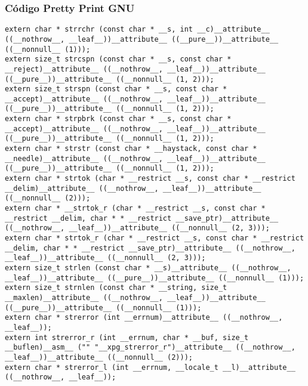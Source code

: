 \documentclass{beamer}
\begin{document}
\begin{frame}[fragile]
\frametitle{C\'odigo Pretty Print GNU}
\begin{verbatim}
extern char * strrchr (const char * __s, int __c)__attribute__ ((__nothrow__, __leaf__))__attribute__ ((__pure__))__attribute__ ((__nonnull__ (1)));
extern size_t strcspn (const char * __s, const char * __reject)__attribute__ ((__nothrow__, __leaf__))__attribute__ ((__pure__))__attribute__ ((__nonnull__ (1, 2)));
extern size_t strspn (const char * __s, const char * __accept)__attribute__ ((__nothrow__, __leaf__))__attribute__ ((__pure__))__attribute__ ((__nonnull__ (1, 2)));
extern char * strpbrk (const char * __s, const char * __accept)__attribute__ ((__nothrow__, __leaf__))__attribute__ ((__pure__))__attribute__ ((__nonnull__ (1, 2)));
extern char * strstr (const char * __haystack, const char * __needle)__attribute__ ((__nothrow__, __leaf__))__attribute__ ((__pure__))__attribute__ ((__nonnull__ (1, 2)));
extern char * strtok (char * __restrict __s, const char * __restrict __delim)__attribute__ ((__nothrow__, __leaf__))__attribute__ ((__nonnull__ (2)));
extern char * __strtok_r (char * __restrict __s, const char * __restrict __delim, char * * __restrict __save_ptr)__attribute__ ((__nothrow__, __leaf__))__attribute__ ((__nonnull__ (2, 3)));
extern char * strtok_r (char * __restrict __s, const char * __restrict __delim, char * * __restrict __save_ptr)__attribute__ ((__nothrow__, __leaf__))__attribute__ ((__nonnull__ (2, 3)));
extern size_t strlen (const char * __s)__attribute__ ((__nothrow__, __leaf__))__attribute__ ((__pure__))__attribute__ ((__nonnull__ (1)));
extern size_t strnlen (const char * __string, size_t __maxlen)__attribute__ ((__nothrow__, __leaf__))__attribute__ ((__pure__))__attribute__ ((__nonnull__ (1)));
extern char * strerror (int __errnum)__attribute__ ((__nothrow__, __leaf__));
extern int strerror_r (int __errnum, char * __buf, size_t __buflen)__asm__ ("" "__xpg_strerror_r")__attribute__ ((__nothrow__, __leaf__))__attribute__ ((__nonnull__ (2)));
extern char * strerror_l (int __errnum, __locale_t __l)__attribute__ ((__nothrow__, __leaf__));
\end{verbatim}
\end{frame}
\end{document}
